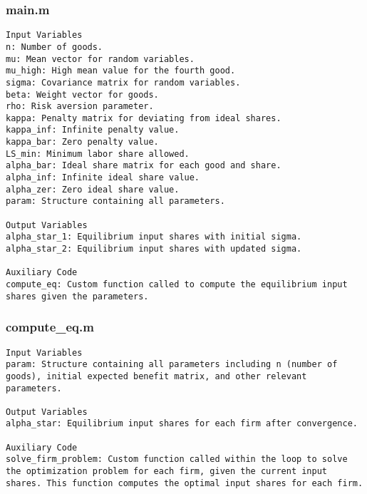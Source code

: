 \documentclass[11pt]{article}
\theoremstyle{definition}
\newcommand{\codepath}{F:/12004835/replication_package_final/replication_package_final}
\begin{document}
	\subsubsection{main.m}
	\begin{lstlisting}[style=Matlab]
Input Variables
n: Number of goods.
mu: Mean vector for random variables.
mu_high: High mean value for the fourth good.
sigma: Covariance matrix for random variables.
beta: Weight vector for goods.
rho: Risk aversion parameter.
kappa: Penalty matrix for deviating from ideal shares.
kappa_inf: Infinite penalty value.
kappa_bar: Zero penalty value.
LS_min: Minimum labor share allowed.
alpha_bar: Ideal share matrix for each good and share.
alpha_inf: Infinite ideal share value.
alpha_zer: Zero ideal share value.
param: Structure containing all parameters.

Output Variables
alpha_star_1: Equilibrium input shares with initial sigma.
alpha_star_2: Equilibrium input shares with updated sigma.

Auxiliary Code
compute_eq: Custom function called to compute the equilibrium input shares given the parameters.
	\end{lstlisting}
	
	
	\subsubsection{compute\_eq.m}
	\begin{lstlisting}[style=Matlab]
Input Variables
param: Structure containing all parameters including n (number of goods), initial expected benefit matrix, and other relevant parameters.

Output Variables
alpha_star: Equilibrium input shares for each firm after convergence.

Auxiliary Code
solve_firm_problem: Custom function called within the loop to solve the optimization problem for each firm, given the current input shares. This function computes the optimal input shares for each firm.
	\end{lstlisting}
	
	
\end{document}
